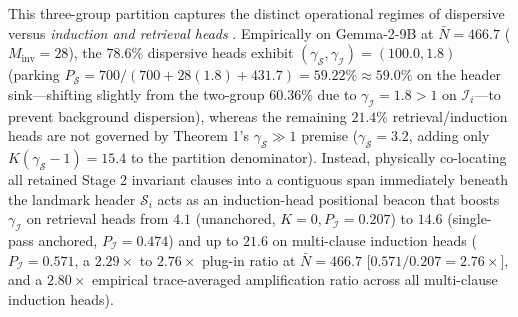\documentclass[conference,10pt]{IEEEtran}
\begin{document}
This three-group partition captures the distinct operational regimes of dispersive versus \textit{induction and retrieval heads} \cite{vaswani2017attention}. Empirically on Gemma-2-9B at $\bar{N}=466.7$ ($M_{\text{inv}}=28$), the $78.6\%$ dispersive heads exhibit $(\gamma_{\mathcal{S}}, \gamma_{\mathcal{I}}) = (100.0, 1.8)$ (parking $P_{\mathcal{S}} = 700 / (700 + 28(1.8) + 431.7) = 59.22\% \approx 59.0\%$ on the header sink---shifting slightly from the two-group $60.36\%$ due to $\gamma_{\mathcal{I}}=1.8 > 1$ on $\mathcal{I}_i$---to prevent background dispersion), whereas the remaining $21.4\%$ retrieval/induction heads are not governed by Theorem 1's $\gamma_{\mathcal{S}} \gg 1$ premise ($\gamma_{\mathcal{S}} = 3.2$, adding only $K(\gamma_{\mathcal{S}} - 1) = 15.4$ to the partition denominator). Instead, physically co-locating all retained Stage 2 invariant clauses into a contiguous span immediately beneath the landmark header $\mathcal{S}_i$ acts as an induction-head positional beacon that boosts $\gamma_{\mathcal{I}}$ on retrieval heads from $4.1$ (unanchored, $K=0, P_{\mathcal{I}} = 0.207$) to $14.6$ (single-pass anchored, $P_{\mathcal{I}} = 0.474$) and up to $21.6$ on multi-clause induction heads ($P_{\mathcal{I}} = 0.571$, a $2.29\times$ to $2.76\times$ plug-in ratio at $\bar{N}=466.7$ [$0.571/0.207 = 2.76\times$], and a $2.80\times$ empirical trace-averaged amplification ratio across all multi-clause induction heads).
\end{document}
